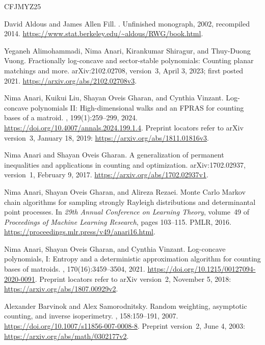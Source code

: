 \documentclass[11pt]{article}
\theoremstyle{definition}
\begin{document}
\begin{thebibliography}{CFJMYZ25}

David Aldous and James Allen Fill.
.
\newblock Unfinished monograph, 2002, recompiled 2014.
\newblock \url{https://www.stat.berkeley.edu/~aldous/RWG/book.html}.

Yeganeh Alimohammadi, Nima Anari, Kirankumar Shiragur, and Thuy-Duong Vuong.
\newblock Fractionally log-concave and sector-stable polynomials:
  Counting planar matchings and more.
\newblock arXiv:2102.02708, version~3, April 3, 2023; first posted 2021.
\newblock \url{https://arxiv.org/abs/2102.02708v3}.

Nima Anari, Kuikui Liu, Shayan {Oveis Gharan}, and Cynthia Vinzant.
\newblock Log-concave polynomials {II}: High-dimensional walks and an {FPRAS}
  for counting bases of a matroid.
, 199(1):259--299, 2024.
\newblock \url{https://doi.org/10.4007/annals.2024.199.1.4}.
\newblock Preprint locators refer to arXiv version~3, January 18, 2019:
  \url{https://arxiv.org/abs/1811.01816v3}.

Nima Anari and Shayan {Oveis Gharan}.
\newblock A generalization of permanent inequalities and applications
  in counting and optimization.
\newblock arXiv:1702.02937, version~1, February 9, 2017.
\newblock \url{https://arxiv.org/abs/1702.02937v1}.

Nima Anari, Shayan {Oveis Gharan}, and Alireza Rezaei.
\newblock Monte Carlo Markov chain algorithms for sampling strongly
  Rayleigh distributions and determinantal point processes.
\newblock In {\em 29th Annual Conference on Learning Theory},
  volume~49 of {\em Proceedings of Machine Learning Research},
  pages 103--115. PMLR, 2016.
\newblock \url{https://proceedings.mlr.press/v49/anari16.html}.

Nima Anari, Shayan {Oveis Gharan}, and Cynthia Vinzant.
\newblock Log-concave polynomials, {I}: Entropy and a deterministic
  approximation algorithm for counting bases of matroids.
, 170(16):3459--3504, 2021.
\newblock \url{https://doi.org/10.1215/00127094-2020-0091}.
\newblock Preprint locators refer to arXiv version~2, November 5, 2018:
  \url{https://arxiv.org/abs/1807.00929v2}.

Alexander Barvinok and Alex Samorodnitsky.
\newblock Random weighting, asymptotic counting, and inverse isoperimetry.
, 158:159--191, 2007.
\newblock \url{https://doi.org/10.1007/s11856-007-0008-8}.
\newblock Preprint version~2, June 4, 2003:
  \url{https://arxiv.org/abs/math/0302177v2}.


\end{thebibliography}
\end{document}
